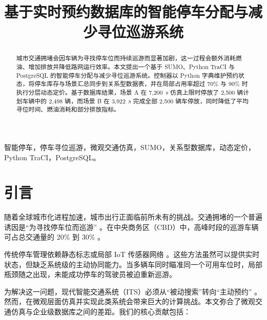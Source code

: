 \documentclass[conference]{IEEEtran}
\begin{document}
\title{基于实时预约数据库的智能停车分配与减少寻位巡游系统}

\author{
    \and
}

\maketitle

\begin{abstract}
城市交通拥堵会因车辆为寻找停车位而持续巡游而显著加剧，这一过程会额外消耗燃油、增加排放并降低路网运行效率。本文提出一个基于 SUMO、Python TraCI 与 PostgreSQL 的智能停车分配与减少寻位巡游系统。控制器以 Python 字典维护预约状态，将停车库存与场景汇总同步到关系型数据表，并在局部占用率超过 70\% 与 90\% 时执行分层动态定价。基于数据库结果，场景 A 在 7,200~s 仿真上限时停放了 2,500 辆计划车辆中的 2,498 辆，而场景 B 在 3,922~s 完成全部 2,500 辆车停放，同时降低了平均寻位时间、燃油消耗和部分排放指标。
\end{abstract}

\begin{IEEEkeywords}
    智能停车，停车寻位巡游，微观交通仿真，SUMO，关系型数据库，动态定价，Python TraCI，PostgreSQL。
\end{IEEEkeywords}

\section{引言}
随着全球城市化进程加速，城市出行正面临前所未有的挑战。交通拥堵的一个普遍诱因是“为寻找停车位而巡游” \cite{b1}。在中央商务区（CBD）中，高峰时段的巡游车辆可占总交通量的 20\% 到 30\% \cite{b2}。

传统停车管理依赖静态标志或局部 IoT 传感器网络 \cite{b3}。这些方法虽然可以提供实时状态，但缺乏系统级的主动协同能力。当多辆车同时瞄准同一个可用车位时，局部瓶颈随之出现，未能成功停车的驾驶员被迫重新巡游。

为解决这一问题，现代智能交通系统（ITS）必须从“被动搜索”转向“主动预约” \cite{b4}。然而，在微观层面仿真并实现此类系统会带来巨大的计算挑战。本文弥合了微观交通仿真与企业级数据库之间的差距。我们的核心贡献包括：
\end{document}
